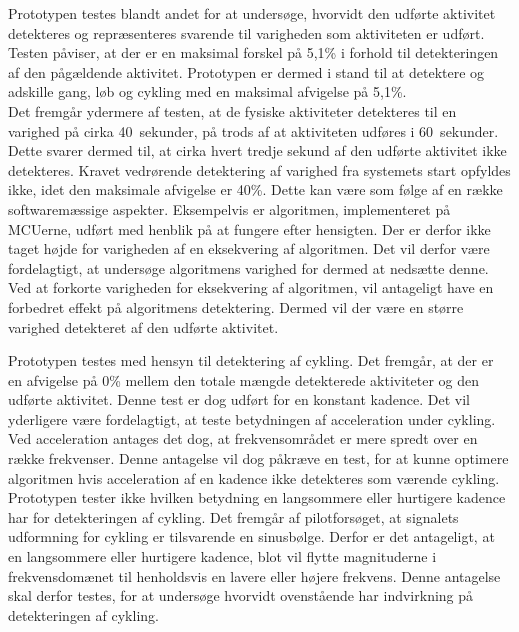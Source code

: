 Prototypen testes blandt andet for at undersøge, hvorvidt den udførte aktivitet detekteres og repræsenteres svarende til varigheden som aktiviteten er udført. Testen påviser, at der er en maksimal forskel på 5,1\% i forhold til detekteringen af den pågældende aktivitet. Prototypen er dermed i stand til at detektere og adskille gang, løb og cykling med en maksimal afvigelse på 5,1\%. \\
Det fremgår ydermere af testen, at de fysiske aktiviteter detekteres til en varighed på cirka 40~sekunder, på trods af at aktiviteten udføres i 60~sekunder. Dette svarer dermed til, at cirka hvert tredje sekund af den udførte aktivitet ikke detekteres. Kravet vedrørende detektering af varighed fra systemets start opfyldes ikke, idet den maksimale afvigelse er 40\%. Dette kan være som følge af en række softwaremæssige aspekter. Eksempelvis er algoritmen, implementeret på MCUerne, udført med henblik på at fungere efter hensigten. Der er derfor ikke taget højde for varigheden af en eksekvering af algoritmen. Det vil derfor være fordelagtigt, at undersøge algoritmens varighed for dermed at nedsætte denne. Ved at forkorte varigheden for eksekvering af algoritmen, vil antageligt have en forbedret effekt på algoritmens detektering. Dermed vil der være en større varighed detekteret af den udførte aktivitet. 

Prototypen testes med hensyn til detektering af cykling. Det fremgår, at der er en afvigelse på 0\% mellem den totale mængde detekterede aktiviteter og den udførte aktivitet. Denne test er dog udført for en konstant kadence. Det vil yderligere være fordelagtigt, at teste betydningen af acceleration under cykling. Ved acceleration antages det dog, at frekvensområdet er mere spredt over en række frekvenser. Denne antagelse vil dog påkræve en test, for at kunne optimere algoritmen hvis acceleration af en kadence ikke detekteres som værende cykling. \\
Prototypen tester ikke hvilken betydning en langsommere eller hurtigere kadence har for detekteringen af cykling. Det fremgår af pilotforsøget, at signalets udformning for cykling er tilsvarende en sinusbølge. Derfor er det antageligt, at en langsommere eller hurtigere kadence, blot vil flytte magnituderne i frekvensdomænet til henholdsvis en lavere eller højere frekvens. Denne antagelse skal derfor testes, for at undersøge hvorvidt ovenstående har indvirkning på detekteringen af cykling.

